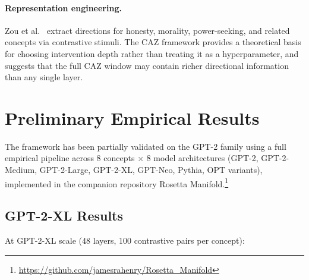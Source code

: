 \documentclass[11pt,a4paper]{article}
\begin{document}
\paragraph{Representation engineering.}
Zou et al.~\citep{zou2023representation} extract directions for honesty, morality,
power-seeking, and related concepts via contrastive stimuli. The CAZ framework
provides a theoretical basis for choosing intervention depth rather than treating
it as a hyperparameter, and suggests that the full CAZ window may contain richer
directional information than any single layer.

\section{Preliminary Empirical Results}
\label{sec:empirical}

The framework has been partially validated on the GPT-2 family using a full empirical
pipeline across 8 concepts $\times$ 8 model architectures (GPT-2, GPT-2-Medium,
GPT-2-Large, GPT-2-XL, GPT-Neo, Pythia, OPT variants), implemented in the companion
repository Rosetta Manifold.\footnote{\url{https://github.com/jamesrahenry/Rosetta_Manifold}}

\subsection{GPT-2-XL Results}

At GPT-2-XL scale (48 layers, 100 contrastive pairs per concept):
\end{document}

